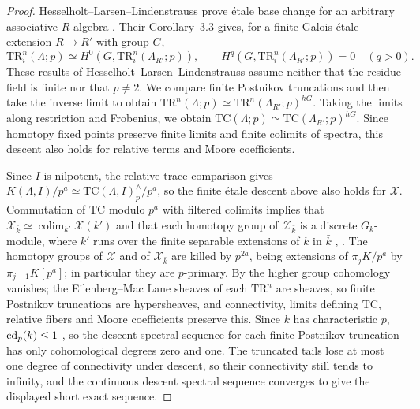 \begin{proof}
Hesselholt--Larsen--Lindenstrauss prove \'etale base change for an arbitrary associative $R$-algebra \cite[Proposition 3.1, Addendum 3.2]{HesselholtLarsenLindenstrauss2020}.
Their Corollary~3.3 gives, for a finite Galois \'etale extension $R\to R'$ with group $G$,
\[
 \mathrm{TR}^n_i(\Lambda;p)\simeq
 H^0(G,\mathrm{TR}^n_i(\Lambda_{R'};p)),\qquad
 H^{q}(G,\mathrm{TR}^n_i(\Lambda_{R'};p))=0\quad(q>0).
\]
These results of Hesselholt--Larsen--Lindenstrauss assume neither that the residue field is finite nor that $p\ne2$.
We compare finite Postnikov truncations and then take the inverse limit to obtain $\mathrm{TR}^n(\Lambda;p)\simeq\mathrm{TR}^n(\Lambda_{R'};p)^{hG}$.
Taking the limits along restriction and Frobenius, we obtain $\mathrm{TC}(\Lambda;p)\simeq\mathrm{TC}(\Lambda_{R'};p)^{hG}$.
Since homotopy fixed points preserve finite limits and finite colimits of spectra, this descent also holds for relative terms and Moore coefficients.

Since $I$ is nilpotent, the relative trace comparison gives $K(\Lambda,I)/p^a\simeq\mathrm{TC}(\Lambda,I)^\wedge_p/p^a$, so the finite \'etale descent above also holds for $\mathcal X$.
Commutation of $\mathrm{TC}$ modulo $p^a$ with filtered colimits implies that $\mathcal X_{\bar k}\simeq\operatorname*{colim}_{k'}\mathcal X(k')$ and that each homotopy group of $\mathcal X_{\bar k}$ is a discrete $G_k$-module, where $k'$ runs over the finite separable extensions of $k$ in $\bar k$ \cite{DundasGoodwillieMcCarthy}, \cite[Theorem 2.7]{ClausenMathewMorrow}.
The homotopy groups of $\mathcal X$ and of $\mathcal X_{\bar k}$ are killed by $p^{2a}$, being extensions of $\pi_jK/p^a$ by $\pi_{j-1}K[p^a]$; in particular they are $p$-primary.
By \cite[Corollary 3.3]{HesselholtLarsenLindenstrauss2020} the higher group cohomology vanishes; the Eilenberg--Mac Lane sheaves of each $\mathrm{TR}^n$ are sheaves, so finite Postnikov truncations are hypersheaves, and connectivity, limits defining $\mathrm{TC}$, relative fibers and Moore coefficients preserve this.
Since $k$ has characteristic $p$, $\operatorname{cd}_p(k)\le1$ \cite[II, \S2.2, Proposition 3]{SerreGalois}, so the descent spectral sequence for each finite Postnikov truncation has only cohomological degrees zero and one.
The truncated tails lose at most one degree of connectivity under descent, so their connectivity still tends to infinity, and the continuous descent spectral sequence converges to give the displayed short exact sequence.
\end{proof}

